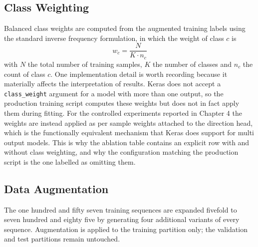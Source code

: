 \subsection{Class Weighting}

Balanced class weights are computed from the augmented training labels using the standard inverse frequency formulation, in which the weight of class $c$ is
\[
w_{c} = \frac{N}{K \cdot n_{c}}
\]
with $N$ the total number of training samples, $K$ the number of classes and $n_{c}$ the count of class $c$. One implementation detail is worth recording because it materially affects the interpretation of results. Keras does not accept a \texttt{class\_weight} argument for a model with more than one output, so the production training script computes these weights but does not in fact apply them during fitting. For the controlled experiments reported in Chapter 4 the weights are instead applied as per sample weights attached to the direction head, which is the functionally equivalent mechanism that Keras does support for multi output models. This is why the ablation table contains an explicit row with and without class weighting, and why the configuration matching the production script is the one labelled as omitting them.

\subsection{Data Augmentation}

The one hundred and fifty seven training sequences are expanded fivefold to seven hundred and eighty five by generating four additional variants of every sequence. Augmentation is applied to the training partition only; the validation and test partitions remain untouched.

